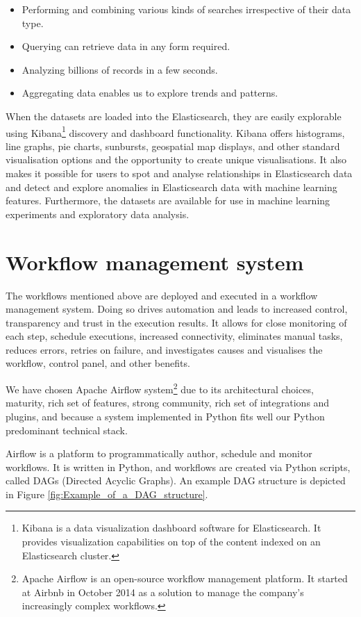 \begin{itemize}
	\item Performing and combining various kinds of searches irrespective of their data type.
	\item Querying can retrieve data in any form required.
	\item Analyzing billions of records in a few seconds.
	\item Aggregating data enables us to explore trends and patterns.
\end{itemize}

When the datasets are loaded into the Elasticsearch, they are easily explorable using Kibana\footnote{ Kibana is a data visualization dashboard software for Elasticsearch. It provides visualization capabilities on top of the content indexed on an Elasticsearch cluster. } discovery and dashboard functionality. Kibana offers histograms, line graphs, pie charts, sunbursts, geospatial map displays, and other standard visualisation options and the opportunity to create unique visualisations. It also makes it possible for users to spot and analyse relationships in Elasticsearch data and detect and explore anomalies in Elasticsearch data with machine learning features. Furthermore, the datasets are available for use in machine learning experiments and exploratory data analysis. 

\section{Workflow management system}

The workflows mentioned above are deployed and executed in a workflow management system. Doing so drives automation and leads to increased control, transparency and trust in the execution results. It allows for close monitoring of each step, schedule executions, increased connectivity, eliminates manual tasks, reduces errors, retries on failure, and investigates causes and visualises the workflow, control panel, and other benefits. 

We have chosen Apache Airflow system\footnote{ Apache Airflow is an open-source workflow management platform. It started at Airbnb in October 2014 as a solution to manage the company's increasingly complex workflows. } due to its architectural choices, maturity, rich set of features, strong community, rich set of integrations and plugins, and because a system implemented in Python fits well our Python predominant technical stack. 

Airflow is a platform to programmatically author, schedule and monitor workflows. It is written in Python, and workflows are created via Python scripts, called DAGs (Directed Acyclic Graphs). An example DAG structure is depicted in Figure \ref{fig:Example_of_a_DAG_structure}. 

